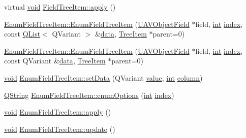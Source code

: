 \begin{DoxyCompactItemize}
\item 
virtual \hyperlink{group___u_a_v_objects_plugin_ga444cf2ff3f0ecbe028adce838d373f5c}{void} \hyperlink{group___u_a_v_object_browser_plugin_gac0c6018349019bfac1859518a7403871}{Field\-Tree\-Item\-::apply} ()
\item 
\hyperlink{group___u_a_v_object_browser_plugin_ga5f84bbb8e18a37ce79f64461e789f788}{Enum\-Field\-Tree\-Item\-::\-Enum\-Field\-Tree\-Item} (\hyperlink{class_u_a_v_object_field}{U\-A\-V\-Object\-Field} $\ast$field, \hyperlink{ioapi_8h_a787fa3cf048117ba7123753c1e74fcd6}{int} \hyperlink{glext_8h_ab47dd9958bcadea08866b42bf358e95e}{index}, const \hyperlink{class_q_list}{Q\-List}$<$ Q\-Variant $>$ \&\hyperlink{glext_8h_a8850df0785e6fbcc2351af3b686b8c7a}{data}, \hyperlink{class_tree_item}{Tree\-Item} $\ast$parent=0)
\item 
\hyperlink{group___u_a_v_object_browser_plugin_ga15760edd8f3a9a12602e371c80ce41d7}{Enum\-Field\-Tree\-Item\-::\-Enum\-Field\-Tree\-Item} (\hyperlink{class_u_a_v_object_field}{U\-A\-V\-Object\-Field} $\ast$field, \hyperlink{ioapi_8h_a787fa3cf048117ba7123753c1e74fcd6}{int} \hyperlink{glext_8h_ab47dd9958bcadea08866b42bf358e95e}{index}, const Q\-Variant \&\hyperlink{glext_8h_a8850df0785e6fbcc2351af3b686b8c7a}{data}, \hyperlink{class_tree_item}{Tree\-Item} $\ast$parent=0)
\item 
\hyperlink{group___u_a_v_objects_plugin_ga444cf2ff3f0ecbe028adce838d373f5c}{void} \hyperlink{group___u_a_v_object_browser_plugin_ga9b505163cede21ebe793e4f55f238591}{Enum\-Field\-Tree\-Item\-::set\-Data} (Q\-Variant \hyperlink{glext_8h_aa0e2e9cea7f208d28acda0480144beb0}{value}, \hyperlink{ioapi_8h_a787fa3cf048117ba7123753c1e74fcd6}{int} \hyperlink{glext_8h_a3b58c39b1b7ca6f4012b27e84de3bdb3}{column})
\item 
\hyperlink{group___u_a_v_objects_plugin_gab9d252f49c333c94a72f97ce3105a32d}{Q\-String} \hyperlink{group___u_a_v_object_browser_plugin_ga8e27834043bde7967a644fdb2b6157f8}{Enum\-Field\-Tree\-Item\-::enum\-Options} (\hyperlink{ioapi_8h_a787fa3cf048117ba7123753c1e74fcd6}{int} \hyperlink{glext_8h_ab47dd9958bcadea08866b42bf358e95e}{index})
\item 
\hyperlink{group___u_a_v_objects_plugin_ga444cf2ff3f0ecbe028adce838d373f5c}{void} \hyperlink{group___u_a_v_object_browser_plugin_ga28f3c98e391b2dc64c680f5f051b1c10}{Enum\-Field\-Tree\-Item\-::apply} ()
\item 
\hyperlink{group___u_a_v_objects_plugin_ga444cf2ff3f0ecbe028adce838d373f5c}{void} \hyperlink{group___u_a_v_object_browser_plugin_ga3eb923fde33bef4803a779dd493e2947}{Enum\-Field\-Tree\-Item\-::update} ()

\end{DoxyCompactItemize}
